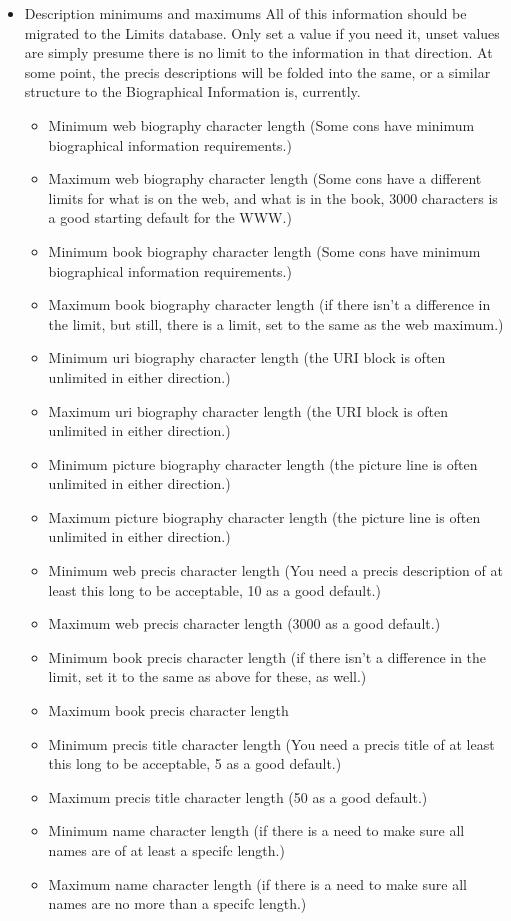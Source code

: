 \documentclass[captions=tablesignature]{scrartcl}
\begin{document}
\begin{itemize}
\item Description minimums and maximums
\label{sec-1-2-4-4}
All of this information should be migrated to the Limits
database.  Only set a value if you need it, unset values are
simply presume there is no limit to the information in that
direction.  At some point, the precis descriptions will be folded
into the same, or a similar structure to the Biographical
Information is, currently.
\begin{itemize}
\item Minimum web biography character length (Some cons have minimum
biographical information requirements.)
\item Maximum web biography character length (Some cons have a
different limits for what is on the web, and what is in the
book, 3000 characters is a good starting default for the WWW.)
\item Minimum book biography character length (Some cons have minimum
biographical information requirements.)
\item Maximum book biography character length (if there isn't a
difference in the limit, but still, there is a limit, set to
the same as the web maximum.)
\item Minimum uri biography character length (the URI block is often
unlimited in either direction.)
\item Maximum uri biography character length (the URI block is often
unlimited in either direction.)
\item Minimum picture biography character length (the picture line is
often unlimited in either direction.)
\item Maximum picture biography character length (the picture line is
often unlimited in either direction.)
\item Minimum web precis character length (You need a precis
description of at least this long to be acceptable, 10 as a
good default.)
\item Maximum web precis character length (3000 as a good default.)
\item Minimum book precis character length (if there isn't a
difference in the limit, set it to the same as above for these,
as well.)
\item Maximum book precis character length
\item Minimum precis title character length (You need a precis title
of at least this long to be acceptable, 5 as a good default.)
\item Maximum precis title character length (50 as a good default.)
\item Minimum name character length (if there is a need to make sure
all names are of at least a specifc length.)
\item Maximum name character length (if there is a need to make sure
all names are no more than a specifc length.)
\end{itemize}


\end{itemize}
\end{document}
